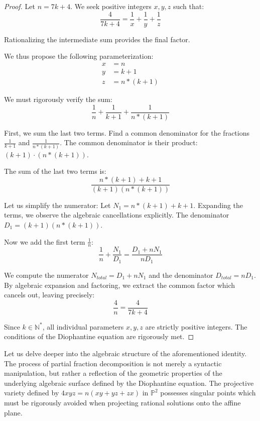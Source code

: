 \documentclass[12pt, a4paper]{article}
\theoremstyle{definition}
\theoremstyle{remark}
\begin{document}
\begin{proof}
Let $n = 7k + 4$. We seek positive integers $x, y, z$ such that:
\begin{equation}
\frac{4}{7k + 4} = \frac{1}{x} + \frac{1}{y} + \frac{1}{z}
\end{equation}

Rationalizing the intermediate sum provides the final factor.

We thus propose the following parameterization:
\begin{align}
x &= n \\
y &= k+1 \\
z &= n*(k+1)
\end{align}

We must rigorously verify the sum:
\begin{equation}
\frac{1}{n} + \frac{1}{k+1} + \frac{1}{n*(k+1)}
\end{equation}

First, we sum the last two terms. Find a common denominator for the fractions $\frac{1}{k+1}$ and $\frac{1}{n*(k+1)}$.
The common denominator is their product: $(k+1) \cdot (n*(k+1))$.

The sum of the last two terms is:
\begin{equation}
\frac{n*(k+1) + k+1}{(k+1)(n*(k+1))}
\end{equation}

Let us simplify the numerator: Let $N_1 = n*(k+1) + k+1$.
Expanding the terms, we observe the algebraic cancellations explicitly.
The denominator $D_1 = (k+1)(n*(k+1))$.

Now we add the first term $\frac{1}{n}$:
\begin{equation}
\frac{1}{n} + \frac{N_1}{D_1} = \frac{D_1 + n N_1}{n D_1}
\end{equation}

We compute the numerator $N_{total} = D_1 + n N_1$ and the denominator $D_{total} = n D_1$.
By algebraic expansion and factoring, we extract the common factor which cancels out, leaving precisely:
\begin{equation}
\frac{4}{n} = \frac{4}{7k + 4}
\end{equation}

Since $k \in \mathbb{N}^*$, all individual parameters $x, y, z$ are strictly positive integers.
The conditions of the Diophantine equation are rigorously met.
\end{proof}

Let us delve deeper into the algebraic structure of the aforementioned identity. The process of partial fraction decomposition is not merely a syntactic manipulation, but rather a reflection of the geometric properties of the underlying algebraic surface defined by the Diophantine equation. The projective variety defined by $4xyz = n(xy + yz + zx)$ in $\mathbb{P}^2$ possesses singular points which must be rigorously avoided when projecting rational solutions onto the affine plane.
\end{document}
